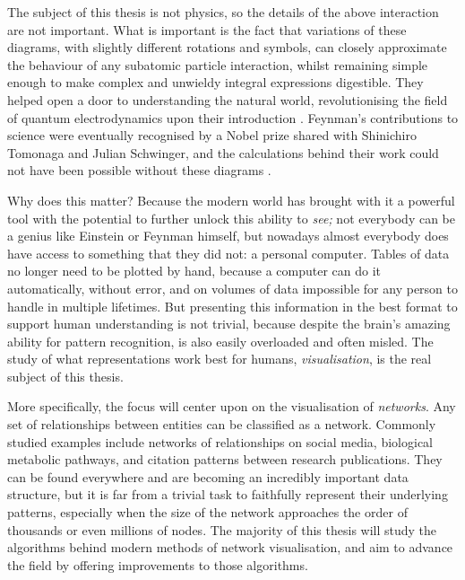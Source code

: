 The subject of this thesis is not physics, so the details of the above interaction are not important. What is important is the fact that variations of these diagrams, with slightly different rotations and symbols, can closely approximate the behaviour of any subatomic particle interaction, whilst remaining simple enough to make complex and unwieldy integral expressions digestible. They helped open a door to understanding the natural world, revolutionising the field of quantum electrodynamics upon their introduction \cite{Kaiser2005}.
Feynman's contributions to science were eventually recognised by a Nobel prize shared with Shinichiro Tomonaga and Julian Schwinger, and the calculations behind their work could not have been possible without these diagrams \cite{Kaiser2009}.

Why does this matter? Because the modern world has brought with it a powerful tool with the potential to further unlock this ability to \emph{see;}
not everybody can be a genius like Einstein or Feynman himself, but nowadays almost everybody does have access to something that they did not: a personal computer.
Tables of data no longer need to be plotted by hand, because a computer can do it automatically, without error, and on volumes of data impossible for any person to handle in multiple lifetimes.
But presenting this information in the best format to support human understanding is not trivial, because despite the brain's amazing ability for pattern recognition, is also easily overloaded and often misled.
The study of what representations work best for humans, \emph{visualisation}, is the real subject of this thesis.

More specifically, the focus will center upon on the visualisation of \emph{networks}. 
Any set of relationships between entities can be classified as a network. Commonly studied examples include networks of relationships on social media, biological metabolic pathways, and citation patterns between research publications. They can be found everywhere and are becoming an incredibly important data structure, but it is far from a trivial task to faithfully represent their underlying patterns, especially when the size of the network approaches the order of thousands or even millions of nodes. The majority of this thesis will study the algorithms behind modern methods of network visualisation, and aim to advance the field by offering improvements to those algorithms.

